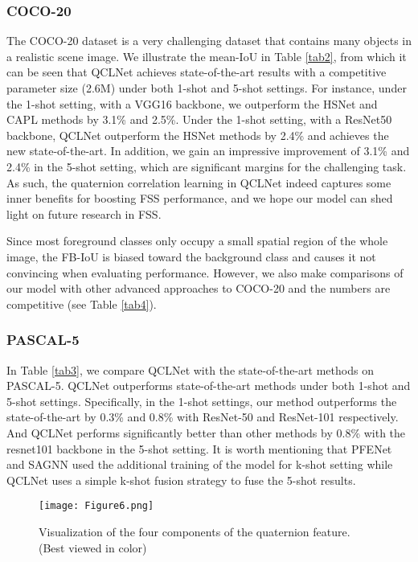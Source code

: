 \documentclass[lettersize,journal]{IEEEtran}
\begin{document}
\subsubsection{COCO-20}
The COCO-20 dataset is a very challenging dataset that contains many objects in a realistic scene image. We illustrate the mean-IoU in Table \ref{tab2}, from which it can be seen that QCLNet achieves state-of-the-art results with a competitive parameter size (2.6M) under both 1-shot and 5-shot settings. For instance, under the 1-shot setting, with a VGG16 backbone, we outperform the HSNet and CAPL methods by 3.1\% and 2.5\%. Under the 1-shot setting, with a ResNet50 backbone, QCLNet outperform the HSNet methods by 2.4\% and achieves the new state-of-the-art. In addition, we gain an impressive improvement of 3.1\% and 2.4\% in the 5-shot setting, which are significant margins for the challenging task. As such, the quaternion correlation learning in QCLNet indeed captures some inner benefits for boosting FSS performance, and we hope our model can shed light on future research in FSS.

Since most foreground classes only occupy a small spatial region of the whole image, the FB-IoU is biased toward the background class and causes it not convincing when evaluating performance. However, we also make comparisons of our model with other advanced approaches to COCO-20 and the numbers are competitive (see Table \ref{tab4}).

\subsubsection{PASCAL-5}
In Table \ref{tab3}, we compare QCLNet with the state-of-the-art methods on PASCAL-5. QCLNet outperforms state-of-the-art methods under both 1-shot and 5-shot settings. Specifically, in the 1-shot settings, our method outperforms the state-of-the-art by 0.3\% and 0.8\% with ResNet-50 and ResNet-101 respectively. And QCLNet performs significantly better than other methods by 0.8\% with the resnet101 backbone in the 5-shot setting. It is worth mentioning that PFENet and SAGNN used the additional training of the model for k-shot setting while QCLNet uses a simple k-shot fusion strategy to fuse the 5-shot results.

\begin{figure}
\texttt{[image: Figure6.png]}
\caption{Visualization of the four components of the quaternion feature. (Best viewed in color)
\label{Figure6}}
\end{figure} 
\end{document}
